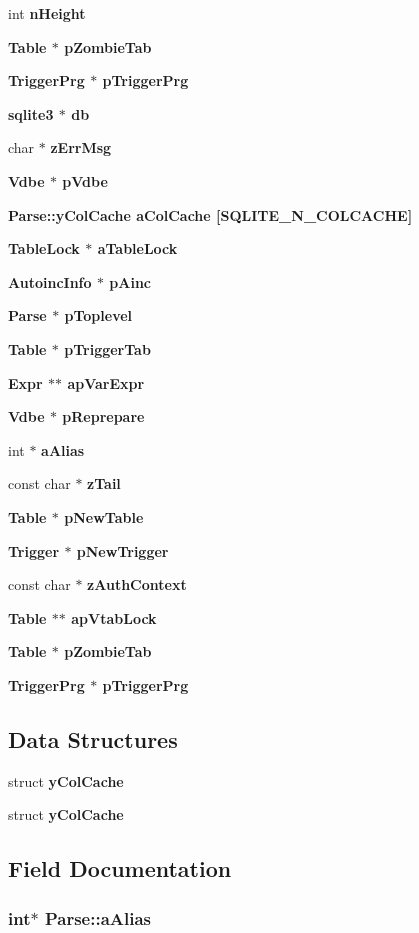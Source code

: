 \begin{CompactItemize}
int \bf{n\-Height}
\item 
\bf{Table} $\ast$ \bf{p\-Zombie\-Tab}
\item 
\bf{Trigger\-Prg} $\ast$ \bf{p\-Trigger\-Prg}
\item 
\bf{sqlite3} $\ast$ \bf{db}
\item 
char $\ast$ \bf{z\-Err\-Msg}
\item 
\bf{Vdbe} $\ast$ \bf{p\-Vdbe}
\item 
\bf{Parse::y\-Col\-Cache} \bf{a\-Col\-Cache} [SQLITE\_\-N\_\-COLCACHE]
\item 
\bf{Table\-Lock} $\ast$ \bf{a\-Table\-Lock}
\item 
\bf{Autoinc\-Info} $\ast$ \bf{p\-Ainc}
\item 
\bf{Parse} $\ast$ \bf{p\-Toplevel}
\item 
\bf{Table} $\ast$ \bf{p\-Trigger\-Tab}
\item 
\bf{Expr} $\ast$$\ast$ \bf{ap\-Var\-Expr}
\item 
\bf{Vdbe} $\ast$ \bf{p\-Reprepare}
\item 
int $\ast$ \bf{a\-Alias}
\item 
const char $\ast$ \bf{z\-Tail}
\item 
\bf{Table} $\ast$ \bf{p\-New\-Table}
\item 
\bf{Trigger} $\ast$ \bf{p\-New\-Trigger}
\item 
const char $\ast$ \bf{z\-Auth\-Context}
\item 
\bf{Table} $\ast$$\ast$ \bf{ap\-Vtab\-Lock}
\item 
\bf{Table} $\ast$ \bf{p\-Zombie\-Tab}
\item 
\bf{Trigger\-Prg} $\ast$ \bf{p\-Trigger\-Prg}
\end{CompactItemize}
\subsection*{Data Structures}
\begin{CompactItemize}
\item 
struct \bf{y\-Col\-Cache}
\item 
struct \bf{y\-Col\-Cache}
\end{CompactItemize}


\subsection{Field Documentation}
\subsubsection{\setlength{\rightskip}{0pt plus 5cm}int$\ast$ \bf{Parse::a\-Alias}}\label{structParse_00094d46de40943645d581bf9da8094f}


